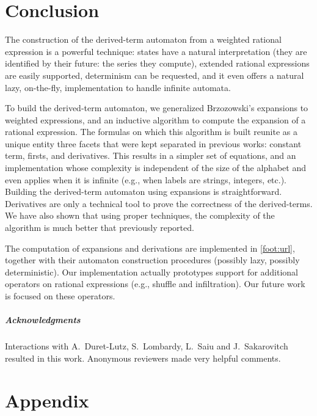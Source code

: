 \documentclass[a4paper,USenglish]{lipics}
\begin{document}
\section{Conclusion}
\label{sec:conc}
The construction of the derived-term automaton from a weighted rational
expression is a powerful technique: states have a natural interpretation
(they are identified by their future: the series they compute), extended
rational expressions are easily supported, determinism can be requested, and
it even offers a natural lazy, on-the-fly, implementation to handle infinite
automata.

To build the derived-term automaton, we generalized Brzozowski's expansions
to weighted expressions, and an inductive algorithm to compute the expansion
of a rational expression.  The formulas on which this algorithm is built
reunite as a unique entity three facets that were kept separated in previous
works: constant term, firsts, and derivatives.  This results in a simpler
set of equations, and an implementation whose complexity is independent of
the size of the alphabet and even applies when it is infinite (e.g., when
labels are strings, integers, etc.).  Building the derived-term automaton
using expansions is straightforward.  Derivatives are only a technical tool
to prove the correctness of the derived-terms.  We have also shown that
using proper techniques, the complexity of the algorithm is much better that
previously reported.

The computation of expansions and derivations are implemented in
\vcsn{}\cref{foot:url}, together with their automaton construction
procedures (possibly lazy, possibly deterministic).  Our implementation
actually prototypes support for additional operators on rational expressions
(e.g., shuffle and infiltration).  Our future work is focused on these
operators.

\subparagraph*{Acknowledgments} Interactions with A.~Duret-Lutz,
S.~Lombardy, L.~Saiu and J.~Sakarovitch resulted in this work.  Anonymous
reviewers made very helpful comments.




\appendix
\section{Appendix}
\label{sec:appendix}
\end{document}
